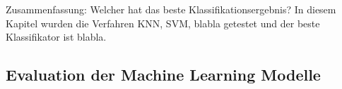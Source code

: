 Zusammenfassung: Welcher hat das beste Klassifikationsergebnis?
In diesem Kapitel wurden die Verfahren KNN, SVM, blabla getestet und der beste Klassifikator ist blabla.

\subsection{Evaluation der Machine Learning Modelle}
\label{sub:evaluation}




























